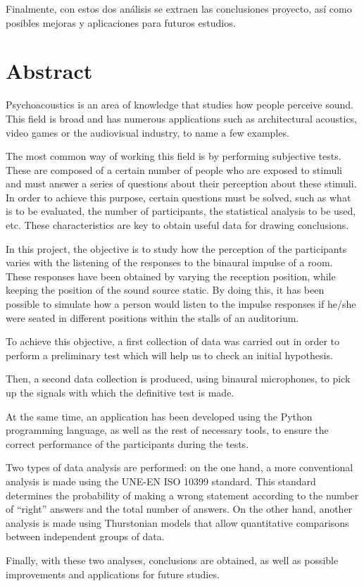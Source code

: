 \documentclass[11pt,a4paper,twoside]{book}
\begin{document}
    Finalmente, con estos dos análisis se extraen las conclusiones proyecto, así como posibles mejoras y aplicaciones para futuros estudios.
    
    \chapter*{Abstract}
    Psychoacoustics is an area of knowledge that studies how people perceive sound. This field is broad and has numerous applications such as architectural acoustics, video games or the audiovisual industry, to name a few examples.

    The most common way of working this field is by performing subjective tests. These are composed of a certain number of people who are exposed to stimuli and must answer a series of questions about their perception about these stimuli. In order to achieve this purpose, certain questions must be solved, such as what is to be evaluated, the number of participants, the statistical analysis to be used, etc. These characteristics are key to obtain useful data for drawing conclusions.

    In this project, the objective is to study how the perception of the participants varies with the listening of the responses to the binaural impulse of a room. These responses have been obtained by varying the reception position, while keeping the position of the sound source static. By doing this, it has been possible to simulate how a person would listen to the impulse responses if he/she were seated in different positions within the stalls of an auditorium.

    To achieve this objective, a first collection of data was carried out in order to perform a preliminary test which will help us to check an initial hypothesis. 

    Then, a second data collection is produced, using binaural microphones, to pick up the signals with which the definitive test is made.

    At the same time, an application has been developed using the Python programming language, as well as the rest of necessary tools, to ensure the correct performance of the participants during the tests.

    Two types of data analysis are performed: on the one hand, a more conventional analysis is made using the UNE-EN ISO 10399 standard. This standard determines the probability of making a wrong statement according to the number of ``right'' answers and the total number of answers. On the other hand, another analysis is made using Thurstonian models that allow quantitative comparisons between independent groups of data.

    Finally, with these two analyses, conclusions are obtained, as well as possible improvements and applications for future studies.
    
    
\end{document}
